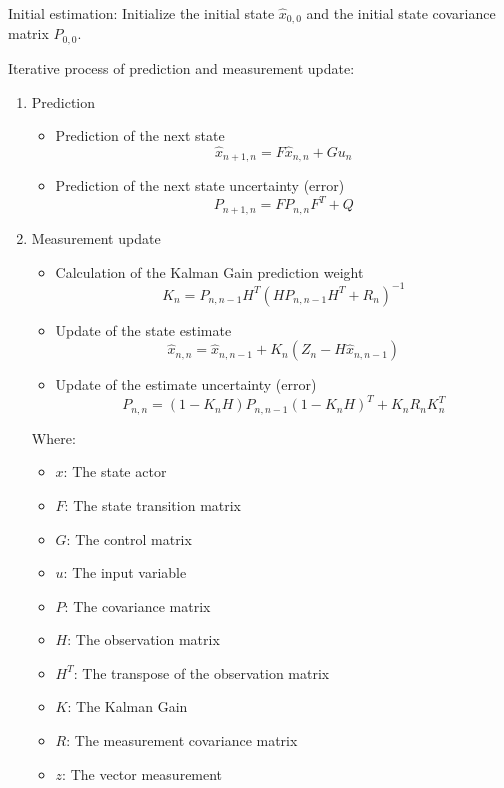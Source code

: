 \documentclass[conference]{IEEEtran}
\begin{document}
Initial estimation: Initialize the initial state $\widehat{x}_{0,0}$ and the initial state covariance matrix $P_{0,0}$.

Iterative process of prediction and measurement update:

\begin{enumerate}
    \item Prediction
    \begin{itemize}
        \item Prediction of the next state
        \[ \widehat{x}_{n + 1, n} = F\widehat{x}_{n, n} + Gu_{n} \]
        \item Prediction of the next state uncertainty (error)
        \[ P_{n + 1, n} = FP_{n, n}F^{T} + Q \]
    \end{itemize}
    \item Measurement update
    \begin{itemize}
        \item Calculation of the Kalman Gain prediction weight
        \[ K_{n} = P_{n, n - 1}H^{T}(HP_{n, n - 1}H^{T} + R_{n})^{-1} \]
        \item Update of the state estimate
        \[ \widehat{x}_{n, n} = \widehat{x}_{n, n - 1} + K_{n}(Z_{n} - H\widehat{x}_{n, n - 1}) \]
        \item Update of the estimate uncertainty (error)
        \[ P_{n, n} = (1 - K_{n}H)P_{n, n - 1}(1 - K_{n}H)^{T} + K_{n}R_{n}K_{n}^{T} \]
    \end{itemize}

Where:
    \begin{itemize}
        \item $x$: The state actor
        \item $F$: The state transition matrix
        \item $G$: The control matrix
        \item $u$: The input variable
        \item $P$: The covariance matrix
        \item $H$: The observation matrix
        \item ${H}^{T}$: The transpose of the observation matrix
        \item $K$: The Kalman Gain
        \item $R$: The measurement covariance matrix
        \item $z$: The vector measurement
    \end{itemize}
\end{enumerate}
\end{document}
